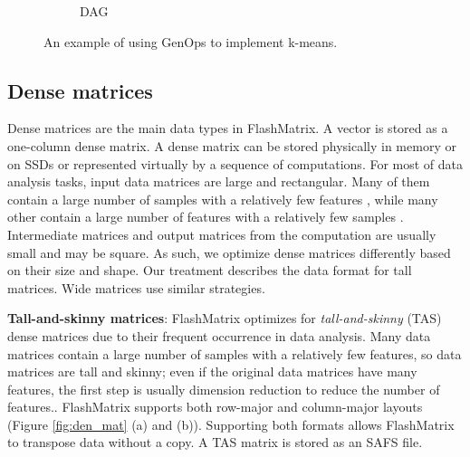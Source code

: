\begin{figure}
\begin{subfigure}{.25\textwidth}
	\label{fig:dag}
	\caption{DAG}
	\end{subfigure}
	\caption{An example of using GenOps to implement k-means.}
	\label{fig:kmeans}
\end{figure}

\subsection{Dense matrices}
Dense matrices are the main data types in FlashMatrix. A vector is stored
as a one-column dense matrix. A dense matrix can be stored
physically in memory or on SSDs or represented virtually by a sequence of
computations.
For most of data analysis tasks, input data matrices are large and rectangular.
Many of them contain a large number of samples with a relatively
few features \cite{}, while many other contain a large number of features with
a relatively few samples \cite{}. Intermediate matrices and output matrices
from the computation are usually small and may be square. As such, we optimize
dense matrices differently based on their size and shape.
Our treatment describes the data format for tall matrices. 
Wide matrices use similar strategies.

\noindent \textbf{Tall-and-skinny matrices}:
FlashMatrix optimizes for \textit{tall-and-skinny} (TAS) dense matrices due to their
frequent occurrence in data analysis. Many data matrices contain
a large number of samples with a relatively few features, so data matrices
are tall and skinny; even if the original data matrices have many features,
the first step is usually dimension reduction \cite{} to reduce the number
of features.. FlashMatrix supports both row-major and column-major
layouts (Figure \ref{fig:den_mat} (a) and (b)).  Supporting both formats
allows FlashMatrix to transpose data without a copy. A TAS matrix is stored
as an SAFS file.

